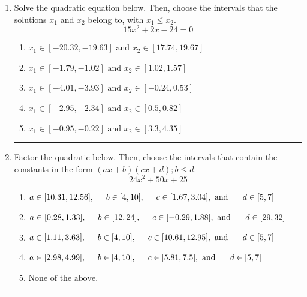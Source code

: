\documentclass[14pt]{extbook}
\newcommand{\litem}[1]{\item#1\hspace*{-1cm}\rule{\textwidth}{0.4pt}}
\begin{document}
\begin{enumerate}
{\begin{enumerate}[label=\Alph*.]
\end{enumerate} }
\litem{
Solve the quadratic equation below. Then, choose the intervals that the solutions $x_1$ and $x_2$ belong to, with $x_1 \leq x_2$.\[ 15x^{2} +2 x -24 = 0 \]\begin{enumerate}[label=\Alph*.]
\item \( x_1 \in [-20.32, -19.63] \text{ and } x_2 \in [17.74, 19.67] \)
\item \( x_1 \in [-1.79, -1.02] \text{ and } x_2 \in [1.02, 1.57] \)
\item \( x_1 \in [-4.01, -3.93] \text{ and } x_2 \in [-0.24, 0.53] \)
\item \( x_1 \in [-2.95, -2.34] \text{ and } x_2 \in [0.5, 0.82] \)
\item \( x_1 \in [-0.95, -0.22] \text{ and } x_2 \in [3.3, 4.35] \)

\end{enumerate} }
\litem{
Factor the quadratic below. Then, choose the intervals that contain the constants in the form $(ax+b)(cx+d); b \leq d.$\[ 24x^{2} +50 x + 25 \]\begin{enumerate}[label=\Alph*.]
\item \( a \in [10.31, 12.56], \hspace*{5mm} b \in [4, 10], \hspace*{5mm} c \in [1.67, 3.04], \text{ and } \hspace*{5mm} d \in [5, 7] \)
\item \( a \in [0.28, 1.33], \hspace*{5mm} b \in [12, 24], \hspace*{5mm} c \in [-0.29, 1.88], \text{ and } \hspace*{5mm} d \in [29, 32] \)
\item \( a \in [1.11, 3.63], \hspace*{5mm} b \in [4, 10], \hspace*{5mm} c \in [10.61, 12.95], \text{ and } \hspace*{5mm} d \in [5, 7] \)
\item \( a \in [2.98, 4.99], \hspace*{5mm} b \in [4, 10], \hspace*{5mm} c \in [5.81, 7.5], \text{ and } \hspace*{5mm} d \in [5, 7] \)
\item \( \text{None of the above.} \)


\end{enumerate}}
\end{enumerate}
\end{document}
